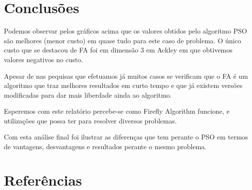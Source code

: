 \documentclass[10pt]{article}
\begin{document}
\newpage

\section{Conclusões}\label{sec:an-da-info-fin-da-org}
  Podemos observar pelos gráficos acima que os valores
  obtidos pelo algoritmo PSO são melhores 
  (menor custo) em quase tudo para este caso de problema.
  O único custo que se destacou de FA foi em dimensão 3 em Ackley
  em que obtivemos valores negativos no custo.

  Apesar de nas pequisas que efetuamos já muitos casos
  se verificam que o FA é um algoritmo que traz melhores resultados
  em curto tempo e que já existem versões modificadas para
  dar mais liberdade ainda ao algoritmo.

  Esperemos com este relatório percebe-se como Firefly
  Algorithm funcione, e utilizações que possa ter para resolver
  diversos problemas.
  
  Com esta análise final foi ilustrar as diferenças 
  que tem perante o PSO em termos de vantagens, desvantagens
  e resultados perante o mesmo problema.




\vspace{1cm}

\section{Referências}\label{sec:sup-inf-utl}


\nocite{FirePso}
\nocite{Firefly_par}



\pagebreak
\end{document}
